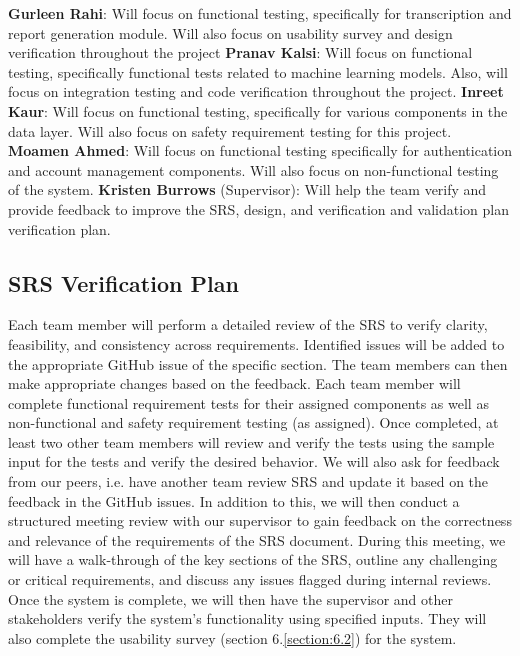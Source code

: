 \documentclass[12pt, titlepage]{article}
\begin{document}
\textbf{Gurleen Rahi}: Will focus on functional testing, specifically for transcription and report generation module. Will also focus on usability survey and design verification throughout the project
\textbf{Pranav Kalsi}: Will focus on functional testing, specifically functional tests related to machine learning models. Also, will focus on integration testing and code verification throughout the project.
\textbf{Inreet Kaur}: Will focus on functional testing, specifically for various components in the data layer. Will also focus on safety requirement testing for this project.
\textbf{Moamen Ahmed}: Will focus on functional testing specifically for authentication and account management components. Will also focus on non-functional testing of the system.
\textbf{Kristen Burrows} (Supervisor): Will help the team verify and provide feedback to improve the SRS, design, and verification and validation plan verification plan. 


\subsection{SRS Verification Plan} \label{section:3.2}

Each team member will perform a detailed review of the SRS to verify clarity, feasibility, and consistency across requirements. Identified issues will be added to the appropriate GitHub issue of the specific section. The team members can then make appropriate changes based on the feedback. Each team member will complete functional requirement tests for their assigned components as well as non-functional and safety requirement testing (as assigned). Once completed, at least two other team members will review and verify the tests using the sample input for the tests and verify the desired behavior. We will also ask for feedback from our peers, i.e. have another team review SRS and update it based on the feedback in the GitHub issues. 
In addition to this, we will then conduct a structured meeting review with our supervisor to gain feedback on the correctness and relevance of the requirements of the SRS document. During this meeting, we will have a walk-through of the key sections of the SRS, outline any challenging or critical requirements, and discuss any issues flagged during internal reviews. 
Once the system is complete, we will then have the supervisor and other stakeholders verify the system's functionality using specified inputs. They will also complete the usability survey (section 6.\ref{section:6.2}) for the system.
\end{document}
